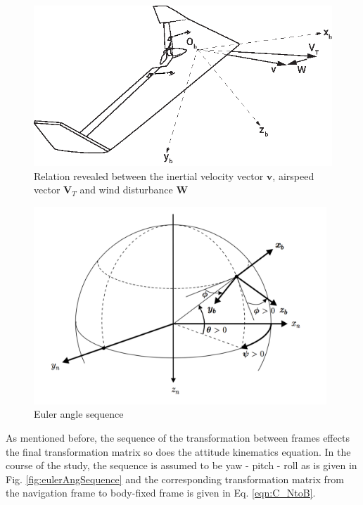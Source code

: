 \begin{figure}
\begin{center}
\includegraphics[width=13cm]{figures/ZagiWindDisturbance}    %
\caption{Relation revealed between the inertial velocity vector $\bm{v}$, airspeed vector $\bm{V}_T$ and wind disturbance $\bm{W}$ \cite{ducard2009fault}} 
\label{fig:windDisturbance}
\end{center}
\end{figure}

\begin{figure}
\begin{center}
\includegraphics[width=11cm]{figures/eulerAnglesAircraft}    %
\caption{Euler angle sequence \cite{ducard2009fault}} 
\label{fig:eulerAnglesAircraft}
\end{center}
\end{figure}

As mentioned before, the sequence of the transformation between frames effects the final transformation matrix so does the attitude kinematics equation. In the course of the study, the sequence is assumed to be yaw - pitch - roll as is given in Fig. \ref{fig:eulerAngSequence} and the corresponding transformation matrix from the navigation frame to body-fixed frame is given in Eq. \ref{eqn:C_NtoB}.

